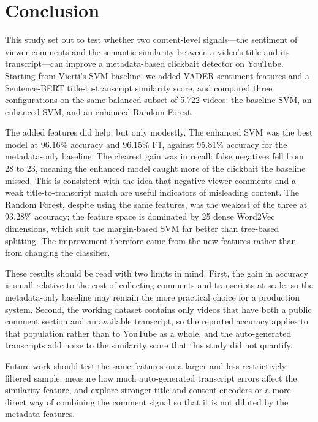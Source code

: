 \documentclass[conference]{IEEEtran}
\begin{document}
\section{Conclusion}

This study set out to test whether two content-level signals---the sentiment of viewer comments and the semantic similarity between a video's title and its transcript---can improve a metadata-based clickbait detector on YouTube. Starting from Vierti's SVM baseline, we added VADER sentiment features and a Sentence-BERT title-to-transcript similarity score, and compared three configurations on the same balanced subset of 5,722 videos: the baseline SVM, an enhanced SVM, and an enhanced Random Forest.

The added features did help, but only modestly. The enhanced SVM was the best model at 96.16\% accuracy and 96.15\% F1, against 95.81\% accuracy for the metadata-only baseline. The clearest gain was in recall: false negatives fell from 28 to 23, meaning the enhanced model caught more of the clickbait the baseline missed. This is consistent with the idea that negative viewer comments and a weak title-to-transcript match are useful indicators of misleading content. The Random Forest, despite using the same features, was the weakest of the three at 93.28\% accuracy; the feature space is dominated by 25 dense Word2Vec dimensions, which suit the margin-based SVM far better than tree-based splitting. The improvement therefore came from the new features rather than from changing the classifier.

These results should be read with two limits in mind. First, the gain in accuracy is small relative to the cost of collecting comments and transcripts at scale, so the metadata-only baseline may remain the more practical choice for a production system. Second, the working dataset contains only videos that have both a public comment section and an available transcript, so the reported accuracy applies to that population rather than to YouTube as a whole, and the auto-generated transcripts add noise to the similarity score that this study did not quantify.

Future work should test the same features on a larger and less restrictively filtered sample, measure how much auto-generated transcript errors affect the similarity feature, and explore stronger title and content encoders or a more direct way of combining the comment signal so that it is not diluted by the metadata features.



\end{document}
